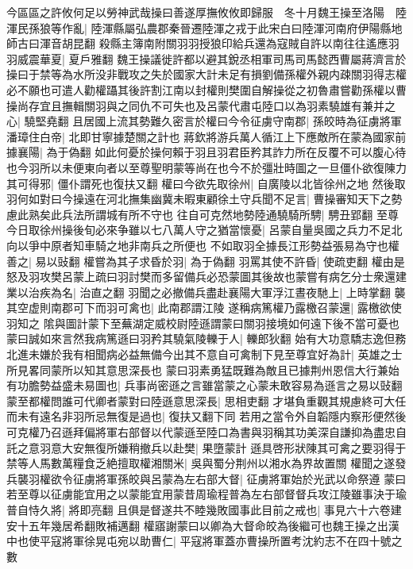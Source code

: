 今區區之許攸何足以勞神武哉操曰善遂厚撫攸攸即歸服　冬十月魏王操至洛陽　陸渾民孫狼等作亂|{
	陸渾縣屬弘農郡秦晉遷陸渾之戎于此宋白曰陸渾河南府伊陽縣地師古曰渾音胡昆翻}
殺縣主簿南附關羽羽授狼印給兵還為寇賊自許以南往往遙應羽羽威震華夏|{
	夏戶雅翻}
魏王操議徙許都以避其銳丞相軍司馬司馬懿西曹屬蔣濟言於操曰于禁等為水所没非戰攻之失於國家大計未足有損劉備孫權外親内疎關羽得志權必不願也可遣人勸權躡其後許割江南以封權則樊圍自解操從之初魯肅嘗勸孫權以曹操尚存宜且撫輯關羽與之同仇不可失也及呂蒙代肅屯陸口以為羽素驍雄有兼并之心|{
	驍堅堯翻}
且居國上流其勢難久密言於權曰今令征虜守南郡|{
	孫皎時為征虜將軍}
潘璋住白帝|{
	北即甘寧據楚關之計也}
蔣欽將游兵萬人循江上下應敵所在蒙為國家前據襄陽|{
	為于偽翻}
如此何憂於操何賴于羽且羽君臣矜其詐力所在反覆不可以腹心待也今羽所以未便東向者以至尊聖明蒙等尚在也今不於彊壯時圖之一旦僵仆欲復陳力其可得邪|{
	僵仆謂死也復扶又翻}
權曰今欲先取徐州|{
	自廣陵以北皆徐州之地}
然後取羽何如對曰今操遠在河北撫集幽冀未暇東顧徐土守兵聞不足言|{
	曹操審知天下之勢慮此熟矣此兵法所謂城有所不守也}
往自可克然地勢陸通驍騎所騁|{
	騁丑郢翻}
至尊今日取徐州操後旬必來争雖以七八萬人守之猶當懷憂|{
	呂蒙自量吳國之兵力不足北向以爭中原者知車騎之地非南兵之所便也}
不如取羽全據長江形勢益張易為守也權善之|{
	易以䜴翻}
權嘗為其子求昏於羽|{
	為于偽翻}
羽罵其使不許昏|{
	使疏吏翻}
權由是怒及羽攻樊呂蒙上疏曰羽討樊而多留備兵必恐蒙圖其後故也蒙嘗有病乞分士衆還建業以治疾為名|{
	治直之翻}
羽聞之必撤備兵盡赴襄陽大軍浮江晝夜馳上|{
	上時掌翻}
襲其空虚則南郡可下而羽可禽也|{
	此南郡謂江陵}
遂稱病篤權乃露檄召蒙還|{
	露檄欲使羽知之}
隂與圖計蒙下至蕪湖定威校尉陸遜謂蒙曰關羽接境如何遠下後不當可憂也蒙曰誠如來言然我病篤遜曰羽矜其驍氣陵轢于人|{
	轢郎狄翻}
始有大功意驕志逸但務北進未嫌於我有相聞病必益無備今出其不意自可禽制下見至尊宜好為計|{
	英雄之士所見畧同蒙所以知其意思深長也}
蒙曰羽素勇猛既難為敵且已據荆州恩信大行兼始有功膽勢益盛未易圖也|{
	兵事尚密遜之言雖當蒙之心蒙未敢容易為遜言之易以䜴翻}
蒙至都權問誰可代卿者蒙對曰陸遜意思深長|{
	思相吏翻}
才堪負重觀其規慮終可大任而未有遠名非羽所忌無復是過也|{
	復扶又翻下同}
若用之當令外自韜隱内察形便然後可克權乃召遜拜偏將軍右部督以代蒙遜至陸口為書與羽稱其功美深自謙抑為盡忠自託之意羽意大安無復所嫌稍撤兵以赴樊|{
	果墮蒙計}
遜具啓形狀陳其可禽之要羽得于禁等人馬數萬糧食乏絶擅取權湘關米|{
	吳與蜀分荆州以湘水為界故置關}
權聞之遂發兵襲羽權欲令征虜將軍孫皎與呂蒙為左右部大督|{
	征虜將軍始於光武以命祭遵}
蒙曰若至尊以征虜能宜用之以蒙能宜用蒙昔周瑜程普為左右部督督兵攻江陵雖事決于瑜普自恃久將|{
	將即亮翻}
且俱是督遂共不睦幾敗國事此目前之戒也|{
	事見六十六卷建安十五年幾居希翻敗補邁翻}
權寤謝蒙曰以卿為大督命皎為後繼可也魏王操之出漢中也使平寇將軍徐晃屯宛以助曹仁|{
	平寇將軍蓋亦曹操所置考沈約志不在四十號之數}
